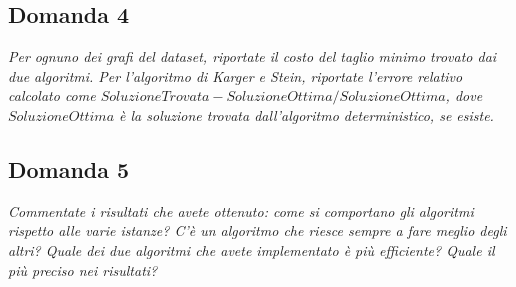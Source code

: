 \subsection{Domanda 4}
\textit{Per ognuno dei grafi del dataset, riportate il costo del taglio minimo trovato dai due algoritmi. Per l'algoritmo di Karger e Stein, riportate l'errore relativo calcolato come $SoluzioneTrovata-SoluzioneOttima/SoluzioneOttima$, dove $SoluzioneOttima$ è la soluzione trovata dall'algoritmo deterministico, se esiste.}

\subsection{Domanda 5}
\textit{Commentate i risultati che avete ottenuto: come si comportano gli algoritmi rispetto alle varie istanze? C'è un algoritmo che riesce sempre a fare meglio degli altri? Quale dei due algoritmi che avete implementato è più efficiente? Quale il più preciso nei risultati?}
